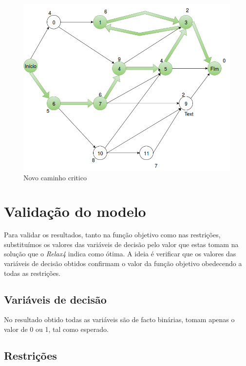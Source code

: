 \begin{figure}[<+htpb+>]
	\centering
	\includegraphics[scale=0.5]{./img/novo_critic}
	\caption{Novo caminho critico}
\label{p3:fig:caminho_critico}
\end{figure}
\section{Validação do modelo}

Para validar os resultados, tanto na função objetivo como nas restrições,
substituímos os valores das variáveis de decisão pelo valor que estas tomam na
solução que o \emph{Relax4} indica como ótima. A ideia é verificar que os valores
das variáveis de decisão obtidos confirmam o valor da função objetivo obedecendo
a todas as restrições.

\subsection{Variáveis de decisão}

No resultado obtido todas as variáveis são de facto binárias, tomam apenas
o valor de 0 ou 1, tal como esperado.


\subsection{Restrições}

